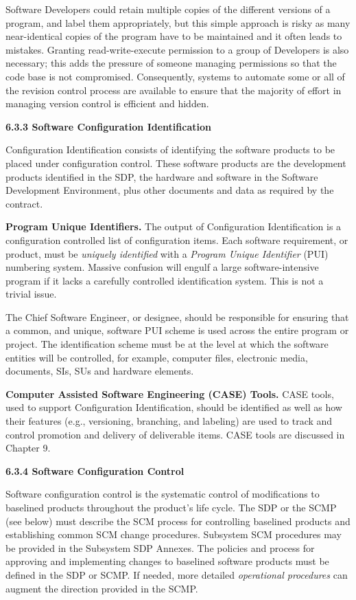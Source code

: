 \documentclass[8pt,twocolumn]{amsart}
\theoremstyle{plain}
\begin{document}
Software Developers could retain multiple copies of the different versions of a program, and label them appropriately, but this simple approach is risky as many near-identical copies of the program have to be maintained and it often leads to mistakes. Granting read-write-execute permission to a group of Developers is also necessary; this adds the pressure of someone managing permissions so that the code base is not compromised. Consequently, systems to automate some or all of the revision control process are available to ensure that the majority of effort in managing version control is efficient and hidden.

{\bf 6.3.3 Software Configuration Identification}

Configuration Identification consists of identifying the software products to be placed under configuration control. These software products are the development products identified in the SDP, the hardware and software in the Software Development Environment, plus other documents and data as required by the contract.

{\bf Program Unique Identifiers.} The output of Configuration Identification is a configuration controlled list of configuration items. Each software requirement, or product, must be {\em uniquely identified} with a {\em Program Unique Identifier} (PUI) numbering system. Massive confusion will engulf a large software-intensive program if it lacks a carefully controlled identification system. This is not a trivial issue.

The Chief Software Engineer, or designee, should be responsible for ensuring that a common, and unique, software PUI scheme is used across the entire program or project. The identification scheme must be at the level at which the software entities will be controlled, for example, computer files, electronic media, documents, SIs, SUs and hardware elements.

{\bf Computer Assisted Software Engineering (CASE) Tools.} CASE tools, used to support Configuration Identification, should be identified as well as how their features (e.g., versioning, branching, and labeling) are used to track and control promotion and delivery of deliverable items. CASE tools are discussed in Chapter 9.

{\bf 6.3.4 Software Configuration Control} 

Software configuration control is the systematic control of modifications to baselined products throughout the product's life cycle. The SDP or the SCMP (see below) must describe the SCM process for controlling baselined products and establishing common SCM change procedures. Subsystem SCM procedures may be provided in the Subsystem SDP Annexes. The policies and process for approving and implementing changes to baselined software products must be defined in the SDP or SCMP. If needed, more detailed {\em operational procedures} can augment the direction provided in the SCMP.
\end{document}
